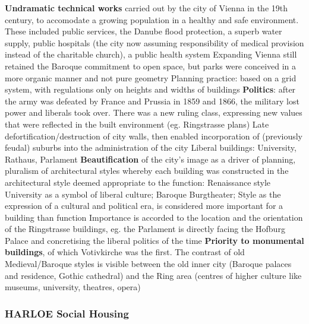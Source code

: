 \documentclass{article}
\begin{document}
\begin{outline}
	\1 \textbf{Undramatic technical works} carried out by the city of Vienna in the 19th century, to accomodate a growing population in a healthy and safe environment. These included public services, the Danube flood protection, a superb water supply, public hospitals (the city now assuming responsibility of medical provision instead of the charitable church), a public health system
		\2 Expanding Vienna still retained the Baroque commitment to open space, but parks were conceived in a more organic manner and not pure geometry
		\2 Planning practice: based on a grid system, with regulations only on heights and widths of buildings
	\1 \textbf{Politics}: after the army was defeated by France and Prussia in 1859 and 1866, the military lost power and liberals took over. There was a new ruling class, expressing new values that were reflected in the built environment (eg. Ringstrasse plans)		\2 Late defortification/destruction of city walls, then enabled incorporation of (previously feudal) suburbs into the administration of the city
		\2 Liberal buildings: University, Rathaus, Parlament
	\1 \textbf{Beautification} of the city's image as a driver of planning, pluralism of architectural styles whereby each building was constructed in the architectural style deemed appropriate to the function: Renaissance style University as a symbol of liberal culture; Baroque Burgtheater; 
		\2 Style as the expression of a cultural and political era, is considered more important for a building than function
		\2 Importance is accorded to the location and the orientation of the Ringstrasse buildings, eg. the Parlament is directly facing the Hofburg Palace and concretising the liberal politics of the time
		\2 \textbf{Priority to monumental buildings}, of which Votivkirche was the first. The contrast of old Medieval/Baroque styles is visible between the old inner city (Baroque palaces and residence, Gothic cathedral) and the Ring area (centres of higher culture like museums, university, theatres, opera)
\end{outline}


\subsubsection{HARLOE Social Housing}
\end{document}
